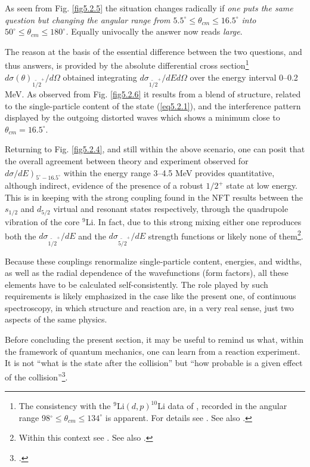 As seen from Fig. \ref{fig5.2.5} the situation changes radically if \textit{one puts the same question but changing the angular range from $5.5^\circ\leq\theta_{cm}\leq16.5^\circ$ into $50^\circ\leq\theta_{cm}\leq180^\circ$.} Equally univocally the answer now reads \textit{large}.

The reason at the basis of the essential difference between the two questions, and thus answers, is provided by the absolute differential cross section\footnote{The consistency with the $^9$Li$(d,p)^{10}$Li data of \cite{Jeppesen:06}, recorded in the angular range 98$^\circ\leq\theta_{cm}\leq134^\circ$ is apparent. For details see \cite{Barranco:20}. See also \cite{Moro:19}.} 
$d\sigma(\theta)_{\widetilde{1/2}^+}/d\Omega$ obtained integrating $d\sigma_{\widetilde{1/2}^+}/dEd\Omega$ over the energy interval 0--0.2 MeV. As observed from Fig. \ref{fig5.2.6} it results from a blend of structure, related to the single-particle content of the state (\ref{eq5.2.1}), and the interference pattern displayed by the outgoing distorted waves which shows a minimum close to $\theta_{cm}=16.5^\circ$.

 Returning to Fig. \ref{fig5.2.4}, and still within the above scenario, one can posit that the overall agreement between theory and experiment observed for $\left.d\sigma/dE\right)_{5^\circ-16.5^\circ}$ within the energy range 3--4.5 MeV provides quantitative, although indirect, evidence of the presence
of a robust $1/2^+$ state at low energy. This is in keeping with the strong coupling found in the NFT results between the $s_{1/2}$ and $d_{5/2}$ virtual and resonant states respectively, through the quadrupole vibration of the core $^9$Li. In fact, due to this strong mixing either one reproduces both the $d\sigma_{\widetilde{1/2}^+}/dE$ and the $d\sigma_{\widetilde{5/2}^+}/dE$ strength functions or likely none of them\footnote{Within this context see \cite{Barranco:20}. See also \cite{Moro:19}.}.


 Because these couplings renormalize single-particle content, energies, and widths, as well as the radial dependence of the wavefunctions (form factors), all these elements have to be calculated self-consistently. The role played by such requirements is likely emphasized in the case like the present one, of continuous spectroscopy, in which structure and reaction are, in a very real sense, just two aspects of the same physics. 

Before concluding the present section, it may be useful to remind us what, within the framework of quantum mechanics, one can learn from a reaction experiment. It is not ``what is the state after the collision'' but ``how probable is a given effect of the collision''\footnote{\cite{Born:26}.}.




